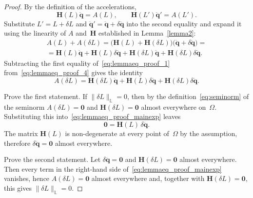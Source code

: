 \documentclass[sn-mathphys-num]{sn-jnl}
\theoremstyle{thmstylethree}
\theoremstyle{thmstyletwo}
\theoremstyle{thmstyleone}
\begin{document}
\begin{proof}
By the definition of the accelerations,
\begin{equation}
\label{eq:lemmaeq_proof_1}
\mathbf{H}(L)\ddot{\mathbf{q}} = A(L),
\qquad
\mathbf{H}(L')\ddot{\mathbf{q}}' = A(L').
\end{equation}
Substitute $L' = L + \delta L$ and $\ddot{\mathbf{q}}' = \ddot{\mathbf{q}} + \delta\ddot{\mathbf{q}}$ into the second equality and expand it using the linearity of $A$ and~$\mathbf{H}$ established in Lemma~\ref{lemma2}:
\begin{equation}
\label{eq:lemmaeq_proof_4}
\begin{split}
A(L)+A(\delta L) = \bigl(\mathbf{H}(L)+\mathbf{H}(\delta L)\bigr)\bigl(\ddot{\mathbf{q}} + \delta \ddot{\mathbf{q}}\bigr)=
\\
=
\mathbf{H}(L)\ddot{\mathbf{q}} + \mathbf{H}(L)\delta \ddot{\mathbf{q}} + \mathbf{H}(\delta L)\ddot{\mathbf{q}} + \mathbf{H}(\delta L)\delta \ddot{\mathbf{q}}.
\end{split}
\end{equation}
Subtracting the first equality of~\eqref{eq:lemmaeq_proof_1} from~\eqref{eq:lemmaeq_proof_4} gives the identity
\begin{equation}
\label{eq:lemmaeq_proof_mainexp}
A(\delta L) = \mathbf{H}(\delta L)\ddot{\mathbf{q}} + \mathbf{H}(L)\delta \ddot{\mathbf{q}} + \mathbf{H}(\delta L)\delta \ddot{\mathbf{q}}.
\end{equation}

Prove the first statement. If $\|\delta L\|_{\mathbb{L}} = 0$, then by the definition~\eqref{eq:seminorm} of the seminorm $A(\delta L) = \mathbf{0}$ and $\mathbf{H}(\delta L) = \mathbf{0}$ almost everywhere on~$\Omega$. Substituting this into~\eqref{eq:lemmaeq_proof_mainexp} leaves
\begin{equation}
\label{eq:lemmaeq_proof_5}
\mathbf{0} = \mathbf{H}(L)\,\delta \ddot{\mathbf{q}}.
\end{equation}
The matrix $\mathbf{H}(L)$ is non-degenerate at every point of~$\Omega$ by the assumption, therefore $\delta \ddot{\mathbf{q}} = \mathbf{0}$ almost everywhere.

Prove the second statement. Let $\delta \ddot{\mathbf{q}} = \mathbf{0}$ and $\mathbf{H}(\delta L) = \mathbf{0}$ almost everywhere. Then every term in the right-hand side of~\eqref{eq:lemmaeq_proof_mainexp} vanishes, hence $A(\delta L) = \mathbf{0}$ almost everywhere and, together with $\mathbf{H}(\delta L)=\mathbf{0}$, this gives $\|\delta L\|_{\mathbb{L}} = 0$.
\end{proof}
\end{document}

